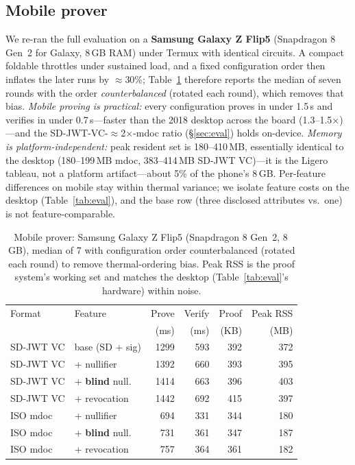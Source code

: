 \documentclass[11pt]{article}
\theoremstyle{plain}
\theoremstyle{definition}
\begin{document}
\subsection{Mobile prover}\label{sec:mobile}
We re-ran the full evaluation on a \textbf{Samsung Galaxy Z Flip5} (Snapdragon 8 Gen~2
for Galaxy, 8\,GB RAM) under Termux with identical circuits. A compact foldable throttles
under sustained load, and a fixed configuration order then inflates the later runs by
$\approx$30\%; Table~\ref{tab:mobile} therefore reports the median of seven rounds with the
order \emph{counterbalanced} (rotated each round), which removes that bias. \emph{Mobile
proving is practical:} every configuration proves in under 1.5\,s and verifies in under
0.7\,s---faster than the 2018 desktop across the board (1.3--1.5$\times$)---and the
SD-JWT-VC-$\approx$2$\times$-mdoc ratio (\S\ref{sec:eval}) holds on-device. \emph{Memory is
platform-independent:} peak resident set is 180--410\,MB, essentially identical to the
desktop (180--199\,MB mdoc, 383--414\,MB SD-JWT VC)---it is the Ligero tableau, not a
platform artifact---about 5\% of the phone's 8\,GB. Per-feature differences on mobile stay
within thermal variance; we isolate feature costs on the desktop (Table~\ref{tab:eval}), and
the base row (three disclosed attributes vs.\ one) is not feature-comparable.

\begin{table}[t]\centering\small
\caption{Mobile prover: Samsung Galaxy Z Flip5 (Snapdragon 8 Gen~2, 8\,GB), median of 7
with configuration order counterbalanced (rotated each round) to remove thermal-ordering
bias. Peak RSS is the proof system's working set and matches the desktop
(Table~\ref{tab:eval}'s hardware) within noise.}
\label{tab:mobile}
\begin{tabular}{@{}llrrrr@{}}
\toprule
Format & Feature & Prove & Verify & Proof & Peak RSS \\
       &         & (ms)  & (ms)   & (KB)  & (MB) \\
\midrule
SD-JWT VC & base (SD + sig)        & 1299 & 593 & 392 & 372 \\
SD-JWT VC & + nullifier            & 1392 & 660 & 393 & 395 \\
SD-JWT VC & + \textbf{blind} null. & 1414 & 663 & 396 & 403 \\
SD-JWT VC & + revocation           & 1442 & 692 & 415 & 397 \\
ISO mdoc  & + nullifier            & \phantom{0}694 & 331 & 344 & 180 \\
ISO mdoc  & + \textbf{blind} null. & \phantom{0}731 & 361 & 347 & 187 \\
ISO mdoc  & + revocation           & \phantom{0}757 & 364 & 361 & 182 \\
\bottomrule
\end{tabular}
\end{table}
\end{document}
